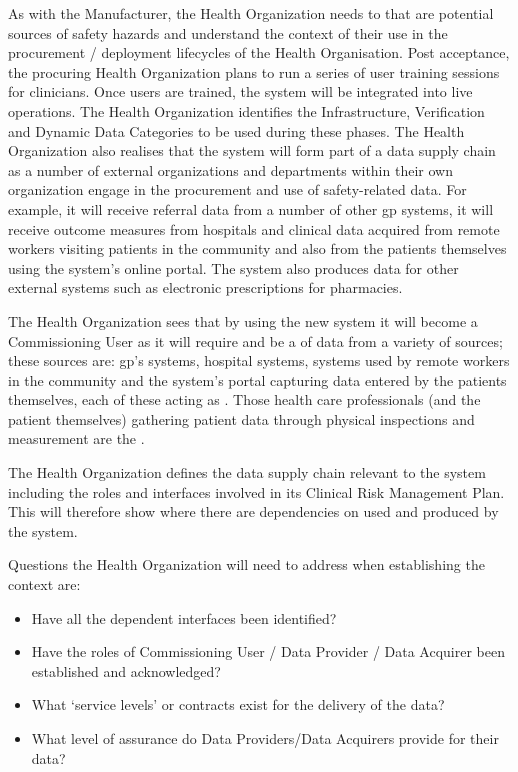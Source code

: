 \cbstart
As with the Manufacturer, the Health Organization needs to  that are potential sources of safety hazards and understand the context of their use in the procurement / deployment lifecycles of the Health Organisation.
Post acceptance, the procuring Health Organization plans to run a series of user training sessions for clinicians.
Once users are trained, the system will be integrated into live operations.
The Health Organization identifies the Infrastructure,
Verification and Dynamic Data Categories to be used
during these phases.
The Health Organization also realises that the system will form part of a data supply chain as a number of external organizations and departments within their own organization engage in the procurement and use of safety-related data.
For example, it will receive referral data from a number of other \gls{gp} systems, it will receive outcome measures from hospitals and clinical data acquired from remote workers visiting patients in the community and also from the patients themselves using the system's online portal.
The system also produces data for other external systems such as electronic prescriptions for pharmacies.
\cbend

The Health Organization sees that by using the new system it will become a Commissioning User as it will require and be a  of data from a variety of sources; these sources are: \gls{gp}'s systems, hospital systems, systems used by remote workers in the community and the system's portal capturing data entered by the patients themselves, each of these acting as . Those health care professionals (and the patient themselves) gathering patient data through physical inspections and measurement are the .

The Health Organization defines the data supply chain relevant to the system including the roles and interfaces involved in its Clinical Risk Management Plan. This will therefore show where there are dependencies on  used and produced by the system.

Questions the Health Organization will need to address when establishing the context are:
\begin{itemize}
  \item Have all the dependent interfaces been identified?
  \item Have the roles of Commissioning User / Data Provider / Data Acquirer been established and acknowledged?
  \item What `service levels' or contracts exist for the delivery of the data?
  \item What level of assurance do Data Providers/Data Acquirers provide for their data?
\end{itemize}

